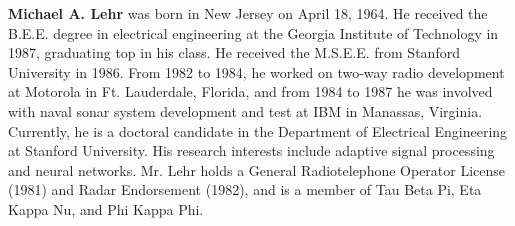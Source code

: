 \documentclass[10pt,twocolumn]{article}
\begin{document}
\vspace{0.6em}
\noindent\textbf{Michael A. Lehr} was born in New Jersey on April 18, 1964. He
received the B.E.E. degree in electrical engineering at the Georgia Institute of
Technology in 1987, graduating top in his class. He received the M.S.E.E. from
Stanford University in 1986. From 1982 to 1984, he worked on two-way radio
development at Motorola in Ft. Lauderdale, Florida, and from 1984 to 1987 he was
involved with naval sonar system development and test at IBM in Manassas,
Virginia. Currently, he is a doctoral candidate in the Department of Electrical
Engineering at Stanford University. His research interests include adaptive
signal processing and neural networks. Mr. Lehr holds a General Radiotelephone
Operator License (1981) and Radar Endorsement (1982), and is a member of Tau Beta
Pi, Eta Kappa Nu, and Phi Kappa Phi.
\end{document}
